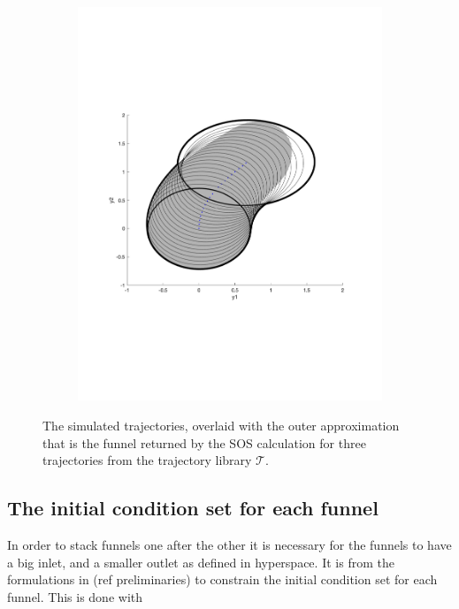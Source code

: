 \begin{figure}
\begin{subfigure}[b]{0.3\textwidth}
    \includegraphics[width=\textwidth]{figures/experiments/FunnelSim5}
  \end{subfigure}
  \caption{The simulated trajectories, overlaid with the outer approximation
    that is the funnel returned by the \ac{SOS} calculation for three
    trajectories from the trajectory library \(\mathcal{T}\).}
  \label{fig:funnel-simulated-overlaid}
\end{figure}

\subsection{The initial condition set for each funnel}

In order to stack funnels one after the other it is necessary for the funnels to
have a big inlet, and a smaller outlet as defined in hyperspace. It is from the
formulations in (ref preliminaries) to constrain the initial condition set for
each funnel. This is done with

